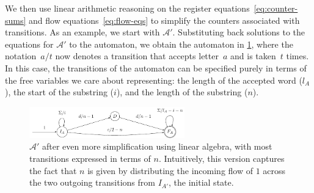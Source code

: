 We then use linear arithmetic reasoning on the register
equations~\eqref{eq:counter-sums} and flow
equations~\eqref{eq:flow-eqs} to simplify the counters associated
with transitions.
As an example, we start with $\mathcal{A}'$. Substituting back
solutions to the equations for $\mathcal{A}'$ to the automaton, we obtain the
automaton in \cref{fig:a_2}, where the notation~$a / t$ now denotes
a transition that accepts letter~$a$ and is taken~$t$ times.
In this case, the transitions of the automaton
can be specified purely in terms of the free
variables we care about representing:  the length of the accepted word ($l_A$), the
start of the substring ($i$), and the length of the substring ($n$).

\begin{figure}[tb]
  \centering 
  \includegraphics[width=0.6\textwidth]{a_2}
  \caption{ $\mathcal{A}'$ after even more simplification using linear algebra,
   with most transitions expressed
  in terms of $n$. Intuitively, this version captures the fact that $n$ is given
  by distributing the incoming flow of $1$ across the two outgoing transitions
  from $I_{A'}$, the initial state.}
  \label{fig:a_2}
\end{figure}


